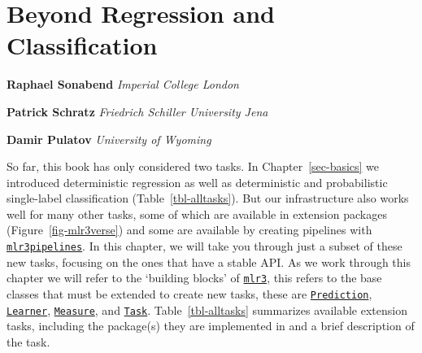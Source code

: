 \hypertarget{sec-special}{%
\chapter{Beyond Regression and Classification}\label{sec-special}}

\vspace{-15mm}

\textbf{Raphael Sonabend} \newline  \emph{Imperial College London}

\textbf{Patrick Schratz} \newline  \emph{Friedrich Schiller University
Jena}

\textbf{Damir Pulatov} \newline  \emph{University of Wyoming}
\newline \newline 

So far, this book has only considered two tasks. In
Chapter~\ref{sec-basics} we introduced deterministic regression as well
as deterministic and probabilistic single-label classification
(Table~\ref{tbl-alltasks}). But our infrastructure also works well for
many other tasks, some of which are available in extension packages
(Figure~\ref{fig-mlr3verse}) and some are available by creating
pipelines with
\href{https://mlr3pipelines.mlr-org.com}{\texttt{mlr3pipelines}}.
In this chapter, we will take you through just a subset of these new
tasks, focusing on the ones that have a stable API. As we work through
this chapter we will refer to the `building blocks' of
\href{https://mlr3.mlr-org.com}{\texttt{mlr3}},
this refers to the base classes that must be extended to create new
tasks, these are
\href{https://mlr3.mlr-org.com/reference/Prediction.html}{\texttt{Prediction}},
\href{https://mlr3.mlr-org.com/reference/Learner.html}{\texttt{Learner}},
\href{https://mlr3.mlr-org.com/reference/Measure.html}{\texttt{Measure}},
and \href{https://mlr3.mlr-org.com/reference/Task.html}{\texttt{Task}}.
Table~\ref{tbl-alltasks} summarizes available extension tasks, including
the package(s) they are implemented in and a brief description of the
task.

